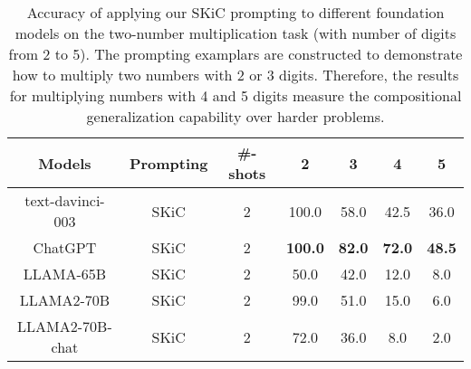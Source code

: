\documentclass{article} %
\begin{document}
\begin{table}[ht]
\caption{Accuracy of applying our SKiC prompting to different foundation models on the two-number multiplication task (with number of digits from 2 to 5). The prompting examplars are constructed to demonstrate how to multiply two numbers with 2 or 3 digits. Therefore, the results for multiplying numbers with 4 and 5 digits  measure the compositional generalization capability over harder problems.} \label{Tab:mul_results_llama2}
\centering
\begin{tabular}{c|c|c|cc|cc} \toprule
\textbf{Models}            & \textbf{Prompting} &\textbf{\#-shots} & \multicolumn{1}{c}{\textbf{2}} & \multicolumn{1}{c|}{\textbf{3}} & \textbf{4}                     & \textbf{5}                     \\ \midrule  \midrule

\multirow{1}{*}{text-davinci-003}  
                           & SKiC  &2             & 100.0                   &58.0                    & 42.5                    &36.0                    \\  
\multirow{1}{*}{ChatGPT}  
                           & SKiC  &2              & \textbf{100.0}                   & \textbf{82.0}                    & \textbf{72.0}                    & \textbf{48.5}                    \\ \midrule


\multirow{1}{*}{LLAMA-65B} 
                           & SKiC    &2            & 50.0                    & 42.0                    & 12.0                    & 8.0                     \\ 

\multirow{1}{*}{LLAMA2-70B} 
                           & SKiC    &2            & 99.0                  & 51.0                    & 15.0                    & 6.0                    \\ 

\multirow{1}{*}{LLAMA2-70B-chat} 
                           & SKiC    &2            & 72.0                    & 36.0                    & 8.0                    & 2.0                     \\  \bottomrule
                     
\end{tabular} 
\end{table}
\end{document}
